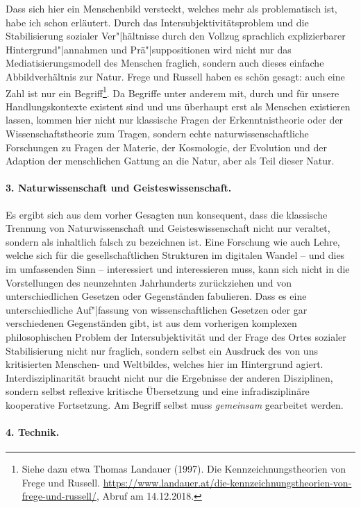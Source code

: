 \documentclass[a4paper,11pt]{article}
\begin{document}
Dass sich hier ein Menschenbild versteckt, welches mehr als problematisch ist,
habe ich schon erläutert. Durch das Intersubjektivitätsproblem und die
Stabilisierung sozialer Ver"|hältnisse durch den Vollzug sprachlich
explizierbarer Hintergrund"|annahmen und Prä"|suppositionen wird nicht nur das
Mediatisierungsmodell des Menschen fraglich, sondern auch dieses einfache
Abbildverhältnis zur Natur. Frege und Russell haben es schön gesagt: auch eine
Zahl ist nur ein Begriff\footnote{Siehe dazu etwa Thomas Landauer (1997). Die
  Kennzeichnungstheorien von Frege und Russell.
  \url{https://www.landauer.at/die-kennzeichnungstheorien-von-frege-und-russell/},
  Abruf am 14.12.2018.}. Da Begriffe unter anderem mit, durch und für unsere
Handlungskontexte existent sind und uns überhaupt erst als Menschen existieren
lassen, kommen hier nicht nur klassische Fragen der Erkenntnistheorie oder der
Wissenschaftstheorie zum Tragen, sondern echte naturwissenschaftliche
Forschungen zu Fragen der Materie, der Kosmologie, der Evolution und der
Adaption der menschlichen Gattung an die Natur, aber als Teil dieser Natur.

\paragraph{3. Naturwissenschaft und Geisteswissenschaft.}

Es ergibt sich aus dem vorher Gesagten nun konsequent, dass die klassische
Trennung von Naturwissenschaft und Geisteswissenschaft nicht nur veraltet,
sondern als inhaltlich falsch zu bezeichnen ist. Eine Forschung wie auch
Lehre, welche sich für die gesellschaftlichen Strukturen im digitalen Wandel –
und dies im umfassenden Sinn – interessiert und interessieren muss, kann sich
nicht in die Vorstellungen des neunzehnten Jahrhunderts zurückziehen und von
unterschiedlichen Gesetzen oder Gegenständen fabulieren. Dass es eine
unterschiedliche Auf"|fassung von wissenschaftlichen Gesetzen oder gar
verschiedenen Gegenständen gibt, ist aus dem vorherigen komplexen
philosophischen Problem der Intersubjektivität und der Frage des Ortes
sozialer Stabilisierung nicht nur fraglich, sondern selbst ein Ausdruck des
von uns kritisierten Menschen- und Weltbildes, welches hier im Hintergrund
agiert. Interdisziplinarität braucht nicht nur die Ergebnisse der anderen
Disziplinen, sondern selbst reflexive kritische Übersetzung und eine
infradisziplinäre kooperative Fortsetzung.  Am Begriff selbst muss
\emph{gemeinsam} gearbeitet werden.

\paragraph{4. Technik.}
\end{document}
